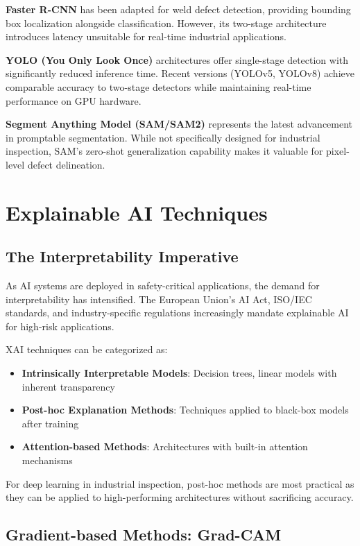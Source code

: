 \documentclass[12pt,a4paper]{report}
\begin{document}
\textbf{Faster R-CNN} has been adapted for weld defect detection, providing bounding box localization alongside classification. However, its two-stage architecture introduces latency unsuitable for real-time industrial applications.

\textbf{YOLO (You Only Look Once)} architectures offer single-stage detection with significantly reduced inference time. Recent versions (YOLOv5, YOLOv8) achieve comparable accuracy to two-stage detectors while maintaining real-time performance on GPU hardware.

\textbf{Segment Anything Model (SAM/SAM2)} represents the latest advancement in promptable segmentation. While not specifically designed for industrial inspection, SAM's zero-shot generalization capability makes it valuable for pixel-level defect delineation.

\section{Explainable AI Techniques}

\subsection{The Interpretability Imperative}

As AI systems are deployed in safety-critical applications, the demand for interpretability has intensified. The European Union's AI Act, ISO/IEC standards, and industry-specific regulations increasingly mandate explainable AI for high-risk applications.

XAI techniques can be categorized as:

\begin{itemize}
    \item \textbf{Intrinsically Interpretable Models}: Decision trees, linear models with inherent transparency
    \item \textbf{Post-hoc Explanation Methods}: Techniques applied to black-box models after training
    \item \textbf{Attention-based Methods}: Architectures with built-in attention mechanisms
\end{itemize}

For deep learning in industrial inspection, post-hoc methods are most practical as they can be applied to high-performing architectures without sacrificing accuracy.

\subsection{Gradient-based Methods: Grad-CAM}
\end{document}
